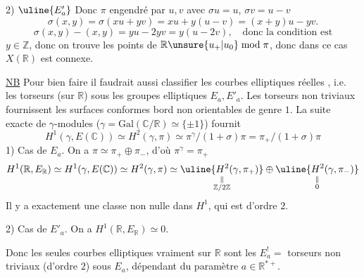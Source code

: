 2) $\uline{E'_a}$ Donc $\pi$ engendré par $u,v$ avec $\sigma u=u$, $\sigma v=u-v$
\[\sigma(x,y)=\sigma(xu+yv)=xu+y(u-v)=(x+y)u-yv.\]
\[\sigma(x,y)-(x,y)=yu-2yv=y(u-2v),\quad\text{donc la condition est}\]
$y\in\mathbb Z$, donc on trouve  les points de $\mathbb R\unsure{u_+|u_0}\bmod\pi$,
donc dans ce cas $X(\mathbb R)$ est connexe.

\uline{NB} Pour bien faire il faudrait aussi classifier les
courbes elliptiques réelles , i.e. les
torseurs (sur $\mathbb R$) sous les  groupes elliptiques
$E_a,E'_a$. Les torseurs non triviaux fournissent les
surfaces conformes  bord non orientables de
genre $1$. La suite exacte de $\gamma$-modules ($\gamma=\mathrm{Gal}(\mathbb C/\mathbb R)\simeq\{\pm1\}$)
fournit
\[
H^1(\gamma,E(\mathbb C))\simeq H^2(\gamma,\pi)\simeq
\pi^\gamma/(1+\sigma)\pi=\pi_+/(1+\sigma)\pi
\]
1) Cas de $E_a$. On a $\pi\simeq\pi_+\oplus\pi_-$, d'où $\pi^\gamma=\pi_+$
\[
H^1(\mathbb R,E_{\mathbb R})\simeq H^1(\gamma,E(\mathbb C))\simeq H^2(\gamma,\pi)
\simeq\underset{\substack{\Vert\\\mathbb Z/2\mathbb Z}}{\uline{H^2(\gamma,\pi_+)}}
\oplus\underset{\substack{\Vert\\0}}{\uline{H^2(\gamma,\pi_-)}}
\]
Il y a exactement une classe non
nulle dans $H^1$, qui est d'ordre $2$.

2) Cas de $E'_a$. On a $H^1(\mathbb R,E_{\mathbb R})\simeq0$.

Donc les seules courbes elliptiques vraiment
 sur $\mathbb R$ sont les $E_a^!=$ torseurs non
triviaux (d'ordre $2$) sous $E_a$, dépendant du
paramètre $a\in\mathbb R^{*+}$.

